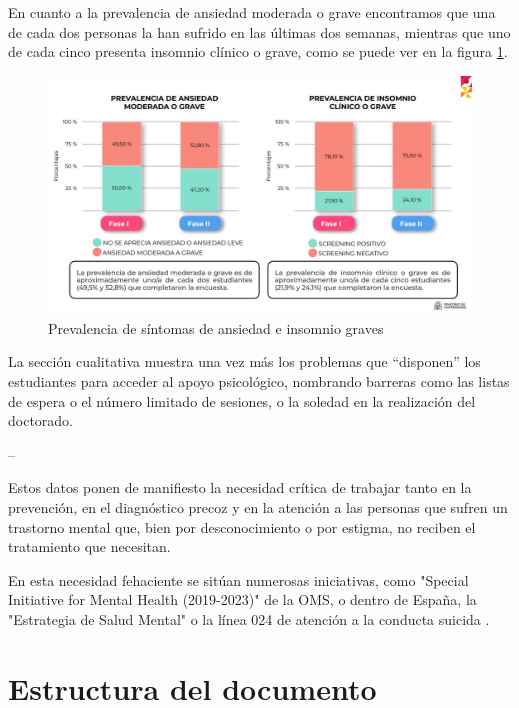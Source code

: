 En cuanto a la prevalencia de ansiedad moderada o grave encontramos que una de cada dos personas la han sufrido en las últimas dos semanas, mientras que uno de cada cinco presenta insomnio clínico o grave, como se puede ver en la figura \ref{fig:intro:sintomas_ansiedad_insomnio}. 

\begin{figure}[h]
    \centering
    \includegraphics[width=0.75\linewidth]{figures/Sintomas ansiedad insomnio.JPG}
    \caption[Prevalencia de síntomas de ansiedad e insomnio graves]{Prevalencia de síntomas de ansiedad e insomnio graves \cite{ministerio_de_universidades_salud_2023}}
    \label{fig:intro:sintomas_ansiedad_insomnio}
\end{figure}

La sección cualitativa muestra una vez más los problemas que ``disponen'' los estudiantes para acceder al apoyo psicológico, nombrando barreras como las listas de espera o el número limitado de sesiones, o la soledad en la realización del doctorado.

--

Estos datos ponen de manifiesto la necesidad crítica de trabajar tanto en la prevención, en el diagnóstico precoz y en la atención a las personas que sufren un trastorno mental que, bien por desconocimiento o por estigma, no reciben el tratamiento que necesitan.

En esta necesidad fehaciente se sitúan numerosas iniciativas, como "Special Initiative for Mental Health (2019-2023)" \cite{oms_salud_nodate} de la OMS, o dentro de España, la "Estrategia de Salud Mental" o la línea 024 de atención a la conducta suicida \cite{la_moncloa_minones_2023}.


\section{Estructura del documento}

